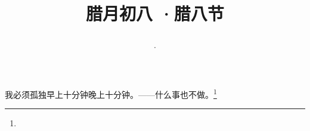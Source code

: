 \title{\date[d=18,m=1,y=2024][year:cn-y,年,month:cn,day:cn,日,·,weekday]·腊月初八 ·腊八节}
我必须孤独早上十分钟晚上十分钟。——什么事也不做。\footnote{ }

